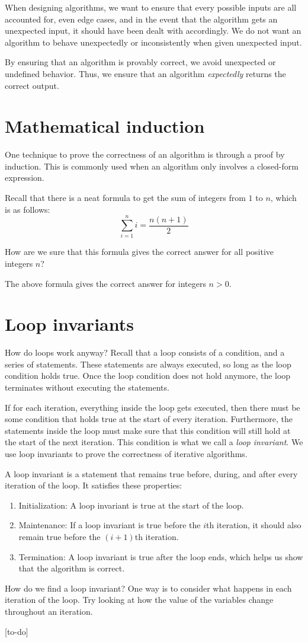 When designing algorithms, we want to ensure that every possible inputs are all accounted for, even edge cases, and in the event that the algorithm gets an unexpected input, it should have been dealt with accordingly. We do not want an algorithm to behave unexpectedly or inconsistently when given unexpected input.

By ensuring that an algorithm is provably correct, we avoid unexpected or undefined behavior. Thus, we ensure that an algorithm \textit{expectedly} returns the correct output.

\section{Mathematical induction}
One technique to prove the correctness of an algorithm is through a proof by induction. This is commonly used when an algorithm only involves a closed-form expression.

Recall that there is a neat formula to get the sum of integers from $1$ to $n$, which is as follows:
\[
\sum_{i=1}^{n} i = \frac{n\left(n+1\right)}{2}
\]

How are we sure that this formula gives the correct answer for all positive integers $n$?

\begin{claim}
The above formula gives the correct answer for integers $n>0$.
\end{claim}

\section{Loop invariants}
How do loops work anyway? Recall that a loop consists of a condition, and a series of statements. These statements are always executed, so long as the loop condition holds true. Once the loop condition does not hold anymore, the loop terminates without executing the statements.

If for each iteration, everything inside the loop gets executed, then there must be some condition that holds true at the start of every iteration. Furthermore, the statements inside the loop must make sure that this condition will still hold at the start of the next iteration. This condition is what we call a \textit{loop invariant}. We use loop invariants to prove the correctness of iterative algorithms.

\begin{definition}
A loop invariant is a statement that remains true before, during, and after every iteration of the loop. It satisfies these properties:
\begin{enumerate}
    \item Initialization: A loop invariant is true at the start of the loop.
    \item Maintenance: If a loop invariant is true before the $i$th iteration, it should also remain true before the $\left(i+1\right)$th iteration.
    \item Termination: A loop invariant is true after the loop ends, which helps us show that the algorithm is correct.
\end{enumerate}
\end{definition}

How do we find a loop invariant? One way is to consider what happens in each iteration of the loop. Try looking at how the value of the variables change throughout an iteration.
\begin{exercises}

[to-do]
\end{exercises}